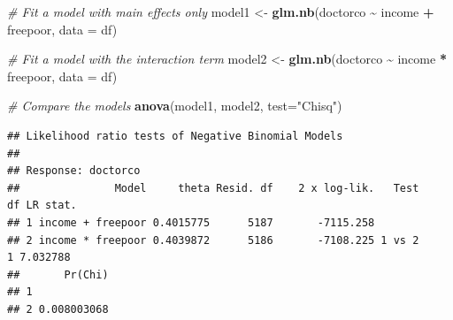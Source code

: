 \documentclass[
]{article}
\newenvironment{Shaded}{\begin{snugshade}}{\end{snugshade}}
\newcommand{\AttributeTok}[1]{\textcolor[rgb]{0.13,0.29,0.53}{#1}}
\newcommand{\CommentTok}[1]{\textcolor[rgb]{0.56,0.35,0.01}{\textit{#1}}}
\newcommand{\FunctionTok}[1]{\textcolor[rgb]{0.13,0.29,0.53}{\textbf{#1}}}
\newcommand{\NormalTok}[1]{#1}
\newcommand{\OtherTok}[1]{\textcolor[rgb]{0.56,0.35,0.01}{#1}}
\newcommand{\SpecialCharTok}[1]{\textcolor[rgb]{0.81,0.36,0.00}{\textbf{#1}}}
\newcommand{\StringTok}[1]{\textcolor[rgb]{0.31,0.60,0.02}{#1}}
\begin{document}
\begin{Shaded}
\begin{Highlighting}[]
\CommentTok{\# Fit a model with main effects only}
\NormalTok{model1 }\OtherTok{\textless{}{-}} \FunctionTok{glm.nb}\NormalTok{(doctorco }\SpecialCharTok{\textasciitilde{}}\NormalTok{ income }\SpecialCharTok{+}\NormalTok{ freepoor, }\AttributeTok{data =}\NormalTok{ df)}

\CommentTok{\# Fit a model with the interaction term}
\NormalTok{model2 }\OtherTok{\textless{}{-}} \FunctionTok{glm.nb}\NormalTok{(doctorco }\SpecialCharTok{\textasciitilde{}}\NormalTok{ income }\SpecialCharTok{*}\NormalTok{ freepoor, }\AttributeTok{data =}\NormalTok{ df)}

\CommentTok{\# Compare the models}
\FunctionTok{anova}\NormalTok{(model1, model2, }\AttributeTok{test=}\StringTok{"Chisq"}\NormalTok{)}
\end{Highlighting}
\end{Shaded}

\begin{verbatim}
## Likelihood ratio tests of Negative Binomial Models
## 
## Response: doctorco
##               Model     theta Resid. df    2 x log-lik.   Test    df LR stat.
## 1 income + freepoor 0.4015775      5187       -7115.258                      
## 2 income * freepoor 0.4039872      5186       -7108.225 1 vs 2     1 7.032788
##       Pr(Chi)
## 1            
## 2 0.008003068
\end{verbatim}
\end{document}
